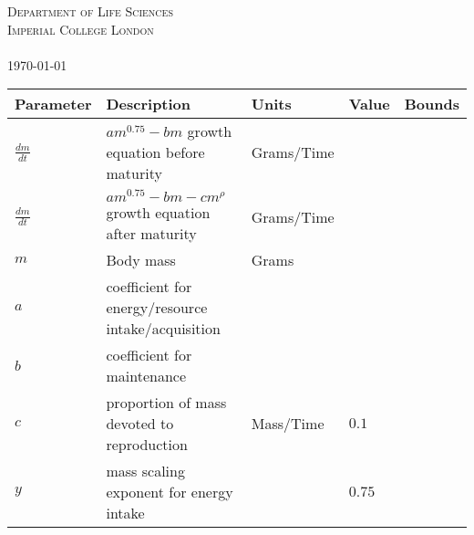 \documentclass[a4paper]{article} %
\begin{document}
\begin{titlepage}
    \textsc{Department of Life Sciences \\ Imperial College London \\ \ }\\[1cm]
    \textsc{\today}\\[2cm] %
    
    \vfill %
    
\end{titlepage}
\begin{tabularx}{\linewidth}{|X|X|X|X|X|}
    \hline
    Parameter           & Description                                               & Units                     & Value                                         & Bounds    \\ \hline
    $\frac{dm}{dt}$     & $am^{0.75} - bm$ growth equation before maturity          & Grams/Time                &                                               &           \\ \hline
    $\frac{dm}{dt}$     & $am^{0.75} - bm - cm^{\rho}$ growth equation after maturity          & Grams/Time                &                                               &           \\ \hline
    $m$                 & Body mass                                                      & Grams                     &                                               &           \\ \hline
    $a$                 & coefficient for energy/resource intake/acquisition        &                           &                                               &            \\ \hline
    $b$                 & coefficient for maintenance                               &                           &                                               &            \\ \hline
    $c$                 & proportion of mass devoted to reproduction                & Mass/Time                           & $0.1$ \autocite{peters1983,Blueweiss1978}    &            \\ \hline
    $y$                 & mass scaling exponent for energy intake                   &                           & $0.75$                                        &                     \\ \hline

\end{tabularx}
\end{document}
